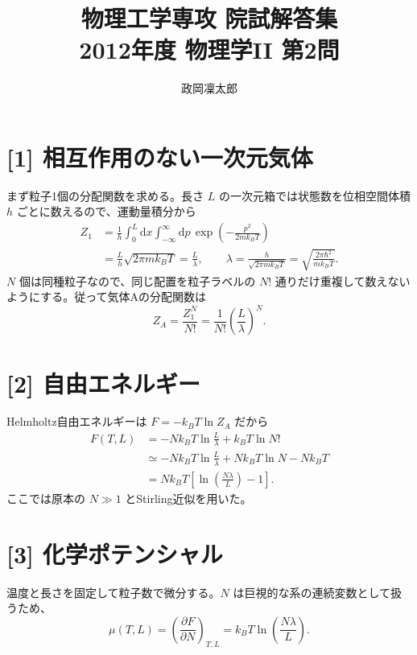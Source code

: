 \documentclass[11pt,a4paper]{article}
\title{物理工学専攻 院試解答集\\2012年度 物理学II 第2問}
\author{政岡凜太郎}
\date{}
\begin{document}
\maketitle

\section*{[1] 相互作用のない一次元気体}
まず粒子1個の分配関数を求める。長さ $L$ の一次元箱では状態数を位相空間体積 $h$ ごとに数えるので、運動量積分から
\begin{align}
  Z_1
  &=\frac{1}{h}\int_0^L\mathrm{d}x
      \int_{-\infty}^{\infty}\mathrm{d}p\,
      \exp\!\left(-\frac{p^2}{2mk_BT}\right)\\
  &=\frac{L}{h}\sqrt{2\pi m k_BT}
   =\frac{L}{\lambda},
  \qquad
  \lambda=\frac{h}{\sqrt{2\pi m k_BT}}
  =\sqrt{\frac{2\pi\hbar^2}{mk_BT}}.
\end{align}
$N$ 個は同種粒子なので、同じ配置を粒子ラベルの $N!$ 通りだけ重複して数えないようにする。従って気体Aの分配関数は
\begin{equation}
  \boxed{Z_A=\frac{Z_1^N}{N!}
    =\frac{1}{N!}\left(\frac{L}{\lambda}\right)^N.}
\end{equation}

\section*{[2] 自由エネルギー}
Helmholtz自由エネルギーは $F=-k_BT\ln Z_A$ だから
\begin{align}
  F(T,L)
  &=-Nk_BT\ln\frac{L}{\lambda}+k_BT\ln N!\\
  &\simeq -Nk_BT\ln\frac{L}{\lambda}
      +Nk_BT\ln N-Nk_BT\\
  &=\boxed{Nk_BT\left[\ln\!\left(\frac{N\lambda}{L}\right)-1\right].}
\end{align}
ここでは原本の $N\gg1$ とStirling近似を用いた。

\section*{[3] 化学ポテンシャル}
温度と長さを固定して粒子数で微分する。$N$ は巨視的な系の連続変数として扱うため、
\begin{equation}
  \boxed{\mu(T,L)=\left(\frac{\partial F}{\partial N}\right)_{T,L}
  =k_BT\ln\!\left(\frac{N\lambda}{L}\right).}
\end{equation}
\end{document}
